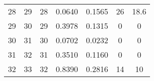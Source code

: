 \begin{table}
\begin{adjustbox}{width=0.95\textwidth,center=\textwidth}
\begin{tabular}{ccccccc}
28                                                        & 29                                                          & 28                                                  & 0.0640                                                                    & 0.1565                                                                    & 26                                                                          & 18.6                                                                             \\
29                                                        & 30                                                          & 29                                                  & 0.3978                                                                    & 0.1315                                                                    & 0                                                                           & 0                                                                                \\
30                                                        & 31                                                          & 30                                                  & 0.0702                                                                    & 0.0232                                                                    & 0                                                                           & 0                                                                                \\
31                                                        & 32                                                          & 31                                                  & 0.3510                                                                    & 0.1160                                                                    & 0                                                                           & 0                                                                                \\
32                                                        & 33                                                          & 32                                                  & 0.8390                                                                    & 0.2816                                                                    & 14                                                                          & 10                                                                               \\

\end{tabular}
\end{adjustbox}
\end{table}
